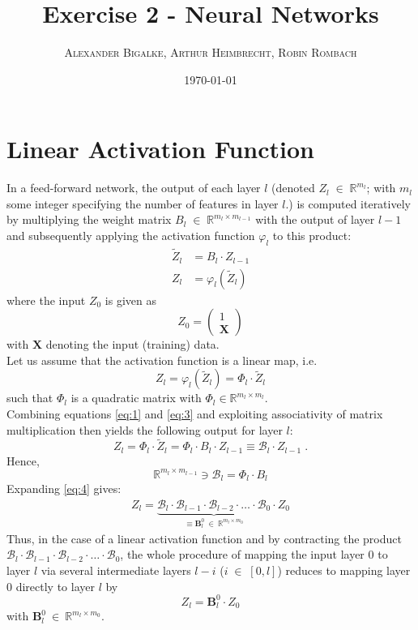 \documentclass[12pt]{article}
\title{Exercise 2 - Neural Networks} %
\author{%
\textsc{Alexander Bigalke, Arthur Heimbrecht, Robin Rombach}}
\date{\today} %
\begin{document}
\maketitle
\section{Linear Activation Function}
In a feed-forward network, the output of each layer $l$ (denoted $Z_l \; \in \; \mathbb{R}^{m_l}$; with $m_l$ some integer specifying the number of features in layer $l$.) is computed iteratively by multiplying the weight matrix $B_l \; \in \; \mathbb{R}^{m_{l}\times m_{l-1}}$ with the output of layer $l-1$ and subsequently applying the activation function $\varphi_l$ to this product: 
\begin{align}
\tilde{Z}_l &= B_{l} \cdot Z_{l-1} \label{eq:1}\\
Z_l &= \varphi_l(\tilde{Z}_l)
\end{align}
where the input $Z_0$ is given as 
$$ Z_0 = \left( \begin{array}{c}1\\\mathbf{X}\end{array} \right) $$
with $\mathbf{X}$ denoting the input (training) data. \\
\newline
Let us assume that the activation function is a linear map, i.e.
\begin{equation}
Z_l = \varphi_l(\tilde{Z}_l) = \Phi_l \cdot \tilde{Z}_l
\label{eq:3} 
\end{equation} 
such that $\Phi_l$ is a quadratic matrix with $\Phi_l \in \mathbb{R}^{m_l \times m_l}$. \\
Combining equations \eqref{eq:1} and \eqref{eq:3} and exploiting associativity of matrix multiplication then yields the following output for layer $l$:
\begin{equation}
Z_l = \Phi_l \cdot \tilde{Z}_l = \Phi_l \cdot B_l \cdot Z_{l-1} \equiv \mathcal{B}_l \cdot Z_{l-1}\;.
\label{eq:4}
\end{equation}
Hence, $$\mathbb{R}^{m_l \times m_{l-1}}\ni \mathcal{B}_l = \Phi_l \cdot B_l $$
Expanding \eqref{eq:4} gives:
\begin{align}
Z_l = \underbrace{ \mathcal{B}_l \cdot \mathcal{B}_{l-1} \cdot \mathcal{B}_{l-2} \cdot \dots \cdot \mathcal{B}_0}_{\equiv \mathbf{B}_l^0 \: \in \: \mathbb{R}^{m_l \times m_0}} \cdot Z_0 
\label{eq:5}
\end{align}
Thus, in the case of a linear activation function and by contracting the product $\mathcal{B}_l \cdot \mathcal{B}_{l-1} \cdot \mathcal{B}_{l-2} \cdot \dots \cdot \mathcal{B}_0$, the whole procedure of mapping the input layer 0 to layer $l$ via several intermediate layers $l-i$ ($i \; \in \; [0, l]$) reduces to mapping layer 0 directly to layer $l$ by
\begin{equation}
Z_l = \mathbf{B}_l^0 \cdot Z_0
\end{equation}
with $\mathbf{B}_l^0 \: \in \: \mathbb{R}^{m_l \times m_0}$.
\end{document}
